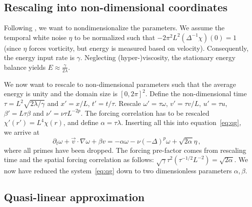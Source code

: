 \documentclass[12pt]{amsart}
\begin{document}
\subsection{Rescaling into non-dimensional coordinates}
\label{ssec:rescale}

Following \cite{bouchet-nardini-tangarife:2013}, we want to
non\-dimen\-sionalize the parameters. We assume the temporal white noise
$\eta$ to be normalized such that $-2\pi^2 L^2 (\Delta^{-1}\chi)(0)=1$
(since $\eta$ forces vorticity, but energy is measured based on
velocity). Consequently, the energy input rate is $\gamma$. Neglecting
(hyper-)viscosity, the stationary energy balance yields
$E\approx\frac{\gamma}{2\lambda}$.

We now want to rescale to non-dimensional parameters such that the
average energy is unity and the domain size is $[0,2\pi]^2$. Define
the non-dimensional time $\tau=L^2\sqrt{2\lambda/\gamma}$ and
$x'=x/L$, $t'=t/\tau$. Rescale $\omega'=\tau\omega$, $v'=\tau v/L$,
$u'=\tau u$, $\beta' = L\tau\beta$ and $\nu' = \nu\tau L^{-2p}$. The
forcing correlation has to be rescaled $\chi'(r')=L^4 \chi(r)$, and define
$\alpha=\tau\lambda$. Inserting all this into equation~\eqref{eq:qg},
we arrive at
\begin{equation}
  \label{eq:qg_rescaled}
  \partial_t \omega + \vec{v}\cdot \nabla \omega + \beta v =
  -\alpha\omega - \nu (-\Delta)^p \omega + \sqrt{2\alpha}\eta\,,
\end{equation}
where all primes have been dropped. The forcing pre-factor comes from
rescaling time and the spatial forcing correlation as follows:
$\sqrt{\gamma}\tau^2 (\tau^{-1/2}L^{-2}) = \sqrt{2\alpha}$. We now
have reduced the system~\eqref{eq:qg} down to two dimensionless
parameters $\alpha, \beta$.

\subsection{Quasi-linear approximation}
\end{document}
